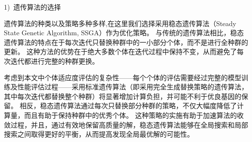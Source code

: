 1)~遗传算法的选择\par
遗传算法的种类以及策略多种多样,在这里我们选择采用稳态遗传算法（Steady State Genetic Algorithm, SSGA）作为优化策略。
与传统的遗传算法相比，稳态遗传算法的特点在于每次迭代只替换种群中的一小部分个体，而不是进行全种群的更新。
这种方法的优势在于绝大多数个体在迭代过程中保持不变，从而避免了每次迭代都进行完整的种群更换。\par

考虑到本文中个体适应度评估的复杂性——每个个体的评估需要经过完整的模型训练及性能评估过程——采用标准遗传算法（即采用完全生成替换策略的遗传算法，其中每次迭代都替换整个种群）将显著增加计算负担，并可能不利于优良基因的保留。
相反，稳态遗传算法通过每次只替换部分种群的策略，不仅大幅度降低了计算量，而且有助于保持种群中的优秀个体。
这种策略的实施有助于加速算法的收敛过程，并且，通过有效地保留高质量的解，稳态遗传算法能够在全局搜索和局部搜索之间取得更好的平衡，从而提高发现全局最优解的可能性。\par

